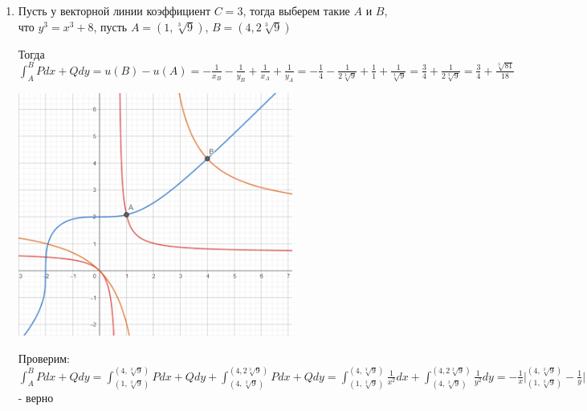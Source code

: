 \begin{enumerate}
    Аналогично для линии потенциалов:

    $\displaystyle -\frac{x}{1 + C_1 x} \neq -\frac{x}{1 + C_2 x} \quad x \neq 0$ - поле неопределенно при $x = 0$

    $1 + C_1 x \neq 1 + C_2 x$

    $C_1 \neq C_2$ - тождество

    \item Пусть у векторной линии коэффициент $C = 3$, тогда выберем такие $A$ и $B$, что $y^3 = x^3 + 8$, пусть $A = (1, \sqrt[3]{9})$, $B = \left(4, 2\sqrt[3]{9}\right)$

    Тогда $\displaystyle \int_A^B Pdx + Qdy = u(B) - u(A) = -\frac{1}{x_B} - \frac{1}{y_B} + \frac{1}{x_A} + \frac{1}{y_A} =
    -\frac{1}{4} - \frac{1}{2\sqrt[3]{9}} + \frac{1}{1} + \frac{1}{\sqrt[3]{9}} =
    \frac{3}{4} + \frac{1}{2\sqrt[3]{9}} = \frac{3}{4} + \frac{\sqrt[3]{81}}{18}$

    \begin{center}
        \includegraphics[height=80mm]{images/4e1}
    \end{center}

    Проверим: $\displaystyle \int_A^B Pdx + Qdy = \int_{(1, \sqrt[3]{9})}^{(4, \sqrt[3]{9})} Pdx + Qdy + \int_{(4, \sqrt[3]{9})}^{(4, 2\sqrt[3]{9})} Pdx + Qdy =
    \int_{(1, \sqrt[3]{9})}^{(4, \sqrt[3]{9})} \frac{1}{x^2}dx + \int_{(4, \sqrt[3]{9})}^{(4, 2\sqrt[3]{9})} \frac{1}{y^2}dy =
    -\frac{1}{x} \Big|_{(1, \sqrt[3]{9})}^{(4, \sqrt[3]{9})} - \frac{1}{y} \Big|_{(4, \sqrt[3]{9})}^{(4, 2\sqrt[3]{9})} =
    -\frac{1}{4} + \frac{1}{1} + (-\frac{1}{2\sqrt[3]{9}} + \frac{1}{\sqrt[3]{9}}) =
    \frac{3}{4} + \frac{1}{2\sqrt[3]{9}}$ - верно


\end{enumerate}

\clearpage
